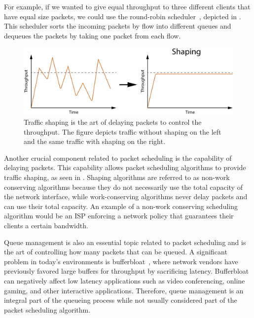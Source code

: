 \documentclass[sigconf, nonacm]{acmart}
\begin{document}
For example, if we wanted to give equal throughput to three different clients that have equal size packets, we could use the round-robin scheduler~\cite{nagle1987packet}, depicted in . This scheduler sorts the incoming packets by flow into different queues and dequeues the packets by taking one packet from each flow.


\begin{figure}
  \includegraphics[width=\linewidth]{traffic-shaping.pdf}
  \caption{Traffic shaping is the art of delaying packets to control the throughput. The figure depicts traffic without shaping on the left and the same traffic with shaping on the right.}
  \label{fig:traffic_shaping}
\end{figure}

Another crucial component related to packet scheduling is the capability of delaying packets. This capability allows packet scheduling algorithms to provide traffic shaping, as seen in . Shaping algorithms are referred to as non-work conserving algorithms because they do not necessarily use the total capacity of the network interface, while work-conserving algorithms never delay packets and can use their total capacity. An example of a non-work conserving scheduling algorithm would be an ISP enforcing a network policy that guarantees their clients a certain bandwidth.

Queue management is also an essential topic related to packet scheduling and is the art of controlling how many packets that can be queued. A significant problem in today's environments is bufferbloat~\cite{gettys2011bufferbloat}, where network vendors have previously favored large buffers for throughput by sacrificing latency. Bufferbloat~\cite{TODO} can negatively affect low latency applications such as video conferencing, online gaming, and other interactive applications. Therefore, queue management is an integral part of the queueing process while not usually considered part of the packet scheduling algorithm.
\end{document}
